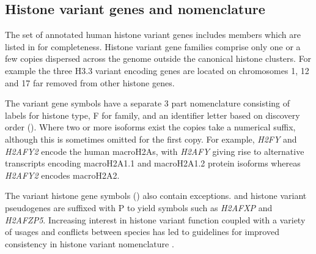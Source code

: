 \subsection{Histone variant genes and nomenclature}
	The set of annotated human histone variant genes 
	includes  members 
	which are listed in  for completeness.
	Histone variant gene families comprise only one or a few copies 
	dispersed across the genome outside the canonical histone clusters.
	For example the three H3.3 variant encoding genes are located 
	on chromosomes 1, 12 and 17 far removed from other histone genes.

	The variant gene symbols have a separate 3 part nomenclature 
	consisting of labels for histone type, F for family, 
	and an identifier letter based on discovery order ().
	Where two or more isoforms exist the copies take a numerical suffix, 
	although this is sometimes omitted for the first copy. 
	For example, \textit{H2FY} and \textit{H2AFY2} encode the human macroH2As, 
	with \textit{H2AFY} giving rise to alternative transcripts encoding macroH2A1.1 and macroH2A1.2 protein isoforms 
	whereas \textit{H2AFY2} encodes macroH2A2.

	The variant histone gene symbols () also contain exceptions.
	and histone variant pseudogenes are suffixed with P to yield symbols such as \textit{H2AFXP} and \textit{H2AFZP5}.
	Increasing interest in histone variant function \citep{MazeAllis2014}
	coupled with a variety of usages and conflicts between species 
	has led to guidelines for improved consistency in histone variant nomenclature \citep{Talbert2012}.

